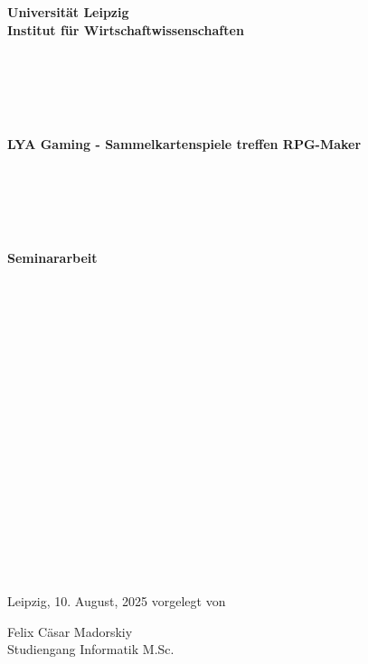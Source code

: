 \documentclass[fontsize=12, a4aper]{scrartcl}
\begin{document}
	
	
	

\begin{center}
	
	\fontsize{14pt}{12pt}
	
	\textbf{Universität Leipzig}\\
	\textbf{Institut für Wirtschaftwissenschaften}\\
	
\end{center}

\begin{verbatim}
	
	
	
	
\end{verbatim}

\begin{center}
	
	\fontsize{14pt}{12pt}
	
	\textbf{LYA Gaming - Sammelkartenspiele treffen RPG-Maker}
	
\end{center}

\begin{verbatim}
	
	
	
	
\end{verbatim}

\begin{center}
	
	\fontsize{18pt}{12pt}
	
	\textbf{Seminararbeit}
	
\end{center}

\begin{verbatim}
	
	
	
	
	
	
	
	
	
	
	
	
	
	
	
	
	
\end{verbatim}

\begin{flushright}
	
	Leipzig, 10. August, 2025 \hfill vorgelegt von\\
	
	\bigskip
	
	Felix Cäsar Madorskiy\\
	Studiengang Informatik M.Sc.
	
\end{flushright}
\end{document}

